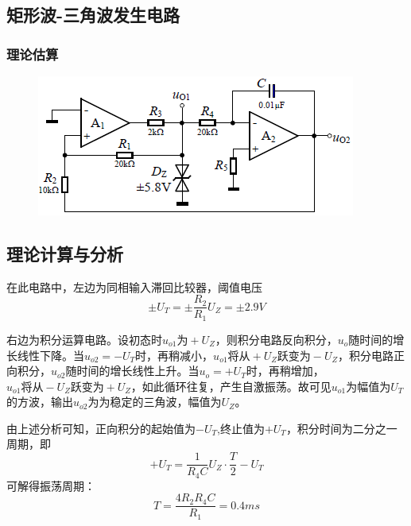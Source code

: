 \documentclass[12pt,a4paper]{article}
\begin{document}
\begin{spacing}{1.3}
\subsection{矩形波-三角波发生电路}
\subsubsection{理论估算}
\begin{figure}[H]
\centering
\includegraphics{7.jpg}
\end{figure}
\subsection{理论计算与分析}
在此电路中，左边为同相输入滞回比较器，阈值电压
\[\pm U_T = \pm \frac{R_2}{R_1}U_Z = \pm 2.9V\] \par
右边为积分运算电路。设初态时$u_{o1}为+U_Z$，则积分电路反向积分，$u_o$随时间的增长线性下降。当$u_{o2}=-U_T$时，再稍减小，$u_{o1}将从+U_Z跃变为-U_Z$，积分电路正向积分，$u_{o2}$随时间的增长线性上升。当$u_o=+U_T$时，再稍增加，$u_{o1}将从-U_Z跃变为+U_Z$，如此循环往复，产生自激振荡。故可见$u_{o1}$为幅值为$U_T$的方波，输出$u_{o2}$为为稳定的三角波，幅值为$U_Z$。\par 
由上述分析可知，正向积分的起始值为$-U_T$,终止值为$+U_T$，积分时间为二分之一周期，即
\[+U_T=\frac{1}{R_4 C} U_Z \cdot \frac{T}{2} -U_T \]
可解得振荡周期：
\[T=\frac{4R_2R_4C}{R_1}=0.4ms\]

\end{spacing}
\end{document}
